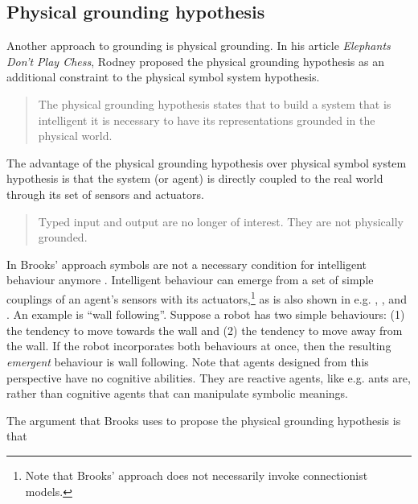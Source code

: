 \subsection{Physical grounding hypothesis}\label{s:theory:pgh}

Another approach to grounding is physical grounding. In his article {\em Elephants Don't Play Chess}, Rodney \citet{brooks:1990} proposed the physical grounding hypothesis as an additional constraint to the physical symbol system hypothesis. 


\begin{quote}
The physical grounding hypothesis states that to build a system that is intelligent it is necessary to have its representations grounded in the physical world. \citep{brooks:1990}
\end{quote}

The advantage of the physical grounding hypothesis over physical symbol system hypothesis is that the system (or agent) is directly coupled to the real world through its set of sensors and actuators. 

\begin{quote}
Typed input and output are no longer of interest. They are not physically grounded. \citep{brooks:1990}
\end{quote}

In Brooks' approach symbols are not a necessary condition for intelligent behaviour anymore \citep{brooks:1990,brooks:1991}. Intelligent behaviour can emerge from a set of simple couplings of an agent's sensors with its actuators,\footnote{Note that Brooks' approach does not necessarily invoke connectionist models.} as is also shown in e.g. \citealt{steelsbrooks:1993}, \citealt{steels:1994}, and \citealt{steels:1996c}. An example is ``wall following''. Suppose a robot has two simple behaviours: (1) the tendency to move towards the wall and (2) the tendency to move away from the wall. If the robot incorporates both behaviours at once, then the resulting {\em emergent} behaviour is wall following. Note that agents designed from this perspective have no cognitive abilities. They are reactive agents, like e.g. ants are, rather than cognitive agents that can manipulate symbolic meanings.

The argument that Brooks uses to propose the physical grounding hypothesis is that

